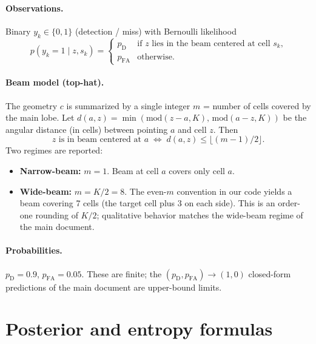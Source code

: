 \documentclass[11pt,a4paper]{article}
\begin{document}
\paragraph{Observations.}  Binary $y_k \in \{0, 1\}$ (detection / miss) with Bernoulli likelihood
\begin{equation}
  p(y_k = 1 \mid z, s_k) = \begin{cases} p_{\mathrm{D}} & \text{if $z$ lies in the beam centered at cell $s_k$,} \\ p_{\mathrm{FA}} & \text{otherwise.} \end{cases}
  \label{eq:likelihood}
\end{equation}

\paragraph{Beam model (top-hat).}  The geometry $c$ is summarized by a single integer $m$ = number of cells covered by the main lobe.  Let $d(a, z) = \min(\mathrm{mod}(z-a, K),\, \mathrm{mod}(a-z, K))$ be the angular distance (in cells) between pointing $a$ and cell $z$.  Then
\begin{equation}
  z \text{ is in beam centered at } a
  \;\iff\; d(a, z) \le \lfloor (m-1)/2 \rfloor.
\end{equation}
Two regimes are reported:
\begin{itemize}[nosep]
  \item \textbf{Narrow-beam:} $m = 1$.  Beam at cell $a$ covers only cell $a$.
  \item \textbf{Wide-beam:} $m = K/2 = 8$.  The even-$m$ convention in our code yields a beam covering 7 cells (the target cell plus 3 on each side).  This is an order-one rounding of $K/2$; qualitative behavior matches the wide-beam regime of the main document.
\end{itemize}

\paragraph{Probabilities.}  $p_{\mathrm{D}} = 0.9$, $p_{\mathrm{FA}} = 0.05$.  These are finite; the $(p_{\mathrm{D}}, p_{\mathrm{FA}}) \to (1, 0)$ closed-form predictions of the main document are upper-bound limits.

\section{Posterior and entropy formulas}
\end{document}

